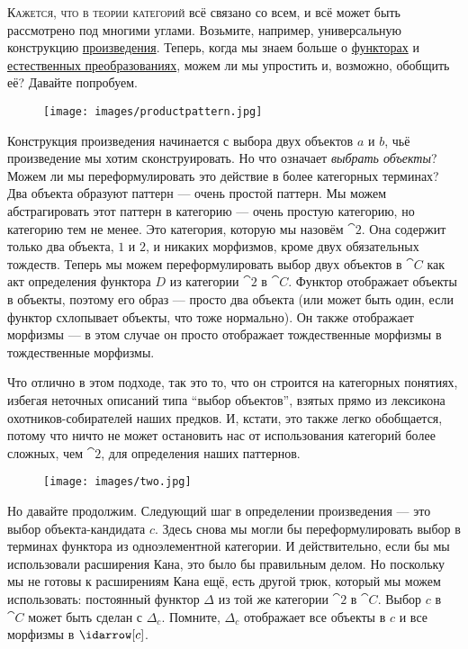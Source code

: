 
\lettrine[lhang=0.17]{К}{ажется, что в теории категорий} всё связано со всем, и
всё может быть рассмотрено под многими углами. Возьмите, например,
универсальную конструкцию \hyperref[products-and-coproducts]{произведения}.
Теперь, когда мы знаем больше о \hyperref[functors]{функторах} и
\hyperref[natural-transformations]{естественных преобразованиях}, можем ли мы упростить и, возможно, обобщить её? Давайте
попробуем.

\begin{figure}[H]
  \centering
  \texttt{[image: images/productpattern.jpg]}
\end{figure}

\noindent
Конструкция произведения начинается с выбора двух объектов
$a$ и $b$, чьё произведение мы хотим сконструировать. Но что
означает \emph{выбрать объекты}? Можем ли мы переформулировать это действие в
более категорных терминах? Два объекта образуют паттерн --- очень простой
паттерн. Мы можем абстрагировать этот паттерн в категорию --- очень простую
категорию, но категорию тем не менее. Это категория, которую мы назовём
$\cat{2}$. Она содержит только два объекта, $1$ и $2$, и никаких морфизмов,
кроме двух обязательных тождеств. Теперь мы можем переформулировать
выбор двух объектов в $\cat{C}$ как акт определения функтора $D$
из категории $\cat{2}$ в $\cat{C}$. Функтор отображает объекты в
объекты, поэтому его образ --- просто два объекта (или может быть один, если
функтор схлопывает объекты, что тоже нормально). Он также отображает морфизмы
--- в этом случае он просто отображает тождественные морфизмы в тождественные
морфизмы.

Что отлично в этом подходе, так это то, что он строится на категорных
понятиях, избегая неточных описаний типа ``выбор
объектов'', взятых прямо из лексикона охотников-собирателей наших
предков. И, кстати, это также легко обобщается, потому что
ничто не может остановить нас от использования категорий более сложных, чем $\cat{2}$,
для определения наших паттернов.

\begin{figure}[H]
  \centering
  \texttt{[image: images/two.jpg]}
\end{figure}

\noindent
Но давайте продолжим. Следующий шаг в определении произведения --- это
выбор объекта-кандидата $c$. Здесь снова мы могли бы
переформулировать выбор в терминах функтора из одноэлементной категории.
И действительно, если бы мы использовали расширения Кана, это было бы правильным
делом. Но поскольку мы не готовы к расширениям Кана ещё, есть
другой трюк, который мы можем использовать: постоянный функтор $\Delta$ из той же категории
$\cat{2}$ в $\cat{C}$. Выбор $c$ в $\cat{C}$ может быть
сделан с $\Delta_c$. Помните, $\Delta_c$ отображает все
объекты в $c$ и все морфизмы в $\idarrow[c]$.

